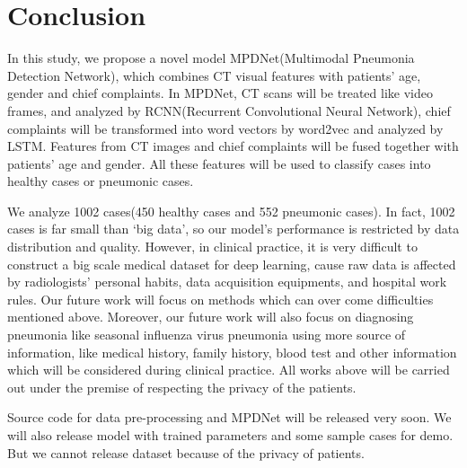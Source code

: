 \documentclass[journal]{IEEEtran}
\begin{document}
\section{Conclusion}
\label{conclude}
In this study, we propose a novel model MPDNet(Multimodal Pneumonia Detection Network), which combines CT visual features with patients' age, gender and chief complaints. In MPDNet, CT scans will be treated like video frames, and analyzed by RCNN(Recurrent Convolutional Neural Network), chief complaints will be transformed into word vectors by word2vec and analyzed by LSTM. Features from CT images and chief complaints will be fused together with patients' age and gender. All these features will be used to classify cases into healthy cases or pneumonic cases.

We analyze 1002 cases(450 healthy cases and 552 pneumonic cases). In fact, 1002 cases is far small than `big data', so our model's performance is restricted by data distribution and quality. However, in clinical practice, it is very difficult to construct a big scale medical dataset for deep learning, cause raw data is affected by radiologists' personal habits, data acquisition equipments, and hospital work rules. Our future work will focus on methods which can over come difficulties mentioned above.
Moreover, our future work will also focus on diagnosing pneumonia like seasonal influenza virus pneumonia using more source of information, like medical history, family history, blood test and other information which will be considered during clinical practice. All works above will be carried out under the premise of respecting the privacy of the patients.
 
Source code for data pre-processing and MPDNet will be released very soon. We will also release model with trained parameters and some sample cases for demo. But we cannot release dataset because of the privacy of patients. 


%
%
\end{document}
